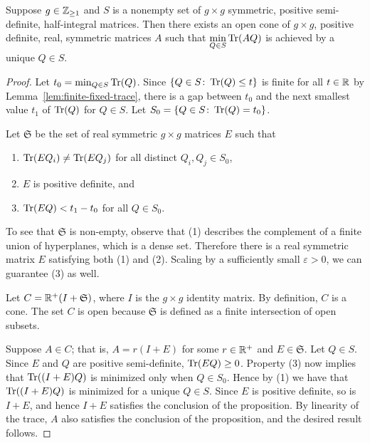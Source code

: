 \documentclass{amsart}
\begin{document}
\begin{proposition}\label{prop:unique-minimizer}
  Suppose $g\in\mathbb{Z}_{\ge 1}$ and $S$ is a nonempty set of $g \times g$ symmetric, positive semi-definite, half-integral matrices. Then there exists an open cone of $g \times g$, positive definite, real, symmetric matrices $A$ such that $\displaystyle\min_{Q \in S}\operatorname{Tr}(AQ)$ is achieved by a unique $Q\in S$.
\end{proposition}
\begin{proof}
Let $t_0 = \min_{Q \in S}\operatorname{Tr}(Q)$.
  Since $\{Q \in S \colon \operatorname{Tr}(Q) \leq t\}$ is finite for all $t \in \mathbb{R}$ by Lemma~\ref{lem:finite-fixed-trace},
  there is a gap between $t_0$ and the next smallest value $t_1$ of $\operatorname{Tr}(Q)$ for $Q \in S$. Let $S_0 = \{Q \in S \colon \operatorname{Tr}(Q) = t_0\}$.

  Let $\mathfrak{S}$ be the set of real symmetric $g \times g$ matrices $E$ such that
  \begin{enumerate}
    \item $\operatorname{Tr}(EQ_i) \neq \operatorname{Tr}(EQ_j)$ for all distinct $Q_i,Q_j \in S_0$,
    \item $E$ is positive definite, and
    \item $\operatorname{Tr}(EQ) < t_1 - t_0$ for all $Q\in S_0$.
  \end{enumerate}
  To see that $\mathfrak{S}$ is non-empty, observe that (1) describes the complement of a finite union of hyperplanes, which is a dense set. Therefore there is a real symmetric matrix $E$ satisfying both (1) and (2). Scaling by a sufficiently small $\varepsilon > 0$, we can guarantee (3) as well.

  Let $C = \mathbb{R}^+(I + \mathfrak{S})$, where $I$ is the $g \times g$ identity matrix. By definition, $C$ is a cone. The set $C$ is open because $\mathfrak{S}$ is defined as a finite intersection of open subsets.

  Suppose $A \in C$; that is, $A = r(I+E)$ for some $r \in \mathbb{R}^+$ and $E \in \mathfrak{S}$. Let $Q \in S$. Since $E$ and $Q$ are positive semi-definite, $\operatorname{Tr}(EQ)\ge 0$. Property (3) now implies that $\operatorname{Tr}((I+E)Q)$ is minimized only when $Q \in S_0$. Hence by (1) we have that $\operatorname{Tr}((I+E)Q)$ is minimized for a unique $Q \in S$. Since $E$ is positive definite, so is $I+E$, and hence $I + E$ satisfies the conclusion of the proposition. By linearity of the trace, $A$ also satisfies the conclusion of the proposition, and the desired result follows.
\end{proof}
\end{document}
